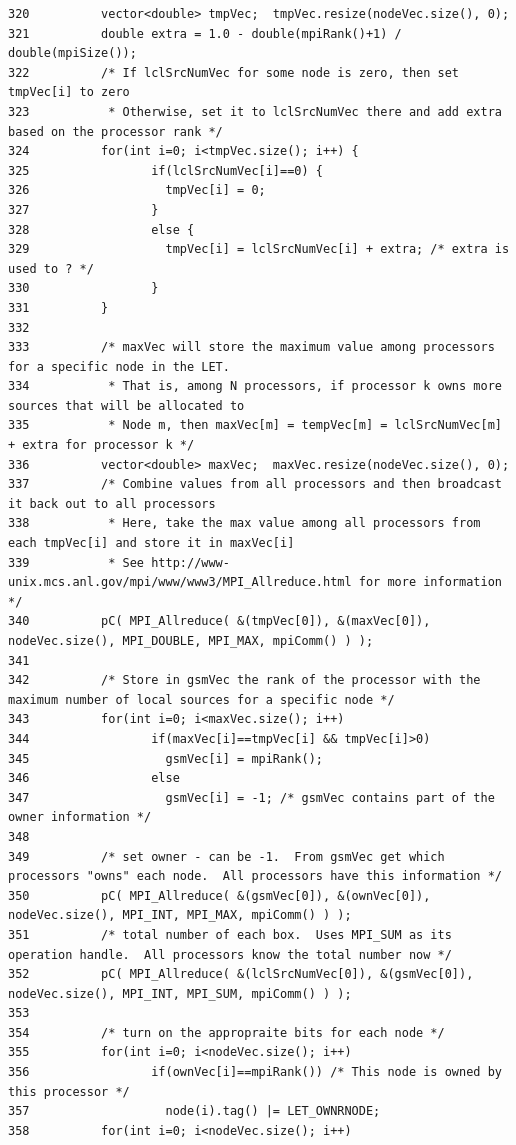 \begin{verbatim}
320          vector<double> tmpVec;  tmpVec.resize(nodeVec.size(), 0);
321          double extra = 1.0 - double(mpiRank()+1) / double(mpiSize());
322          /* If lclSrcNumVec for some node is zero, then set tmpVec[i] to zero
323           * Otherwise, set it to lclSrcNumVec there and add extra based on the processor rank */
324          for(int i=0; i<tmpVec.size(); i++) {
325                 if(lclSrcNumVec[i]==0) {
326                   tmpVec[i] = 0;
327                 }
328                 else {
329                   tmpVec[i] = lclSrcNumVec[i] + extra; /* extra is used to ? */
330                 }
331          }
332 
333          /* maxVec will store the maximum value among processors for a specific node in the LET.
334           * That is, among N processors, if processor k owns more sources that will be allocated to
335           * Node m, then maxVec[m] = tempVec[m] = lclSrcNumVec[m] + extra for processor k */
336          vector<double> maxVec;  maxVec.resize(nodeVec.size(), 0);
337          /* Combine values from all processors and then broadcast it back out to all processors
338           * Here, take the max value among all processors from each tmpVec[i] and store it in maxVec[i]
339           * See http://www-unix.mcs.anl.gov/mpi/www/www3/MPI_Allreduce.html for more information */
340          pC( MPI_Allreduce( &(tmpVec[0]), &(maxVec[0]), nodeVec.size(), MPI_DOUBLE, MPI_MAX, mpiComm() ) );
341 
342          /* Store in gsmVec the rank of the processor with the maximum number of local sources for a specific node */ 
343          for(int i=0; i<maxVec.size(); i++)
344                 if(maxVec[i]==tmpVec[i] && tmpVec[i]>0)
345                   gsmVec[i] = mpiRank();
346                 else
347                   gsmVec[i] = -1; /* gsmVec contains part of the owner information */
348 
349          /* set owner - can be -1.  From gsmVec get which processors "owns" each node.  All processors have this information */
350          pC( MPI_Allreduce( &(gsmVec[0]), &(ownVec[0]), nodeVec.size(), MPI_INT, MPI_MAX, mpiComm() ) );
351          /* total number of each box.  Uses MPI_SUM as its operation handle.  All processors know the total number now */
352          pC( MPI_Allreduce( &(lclSrcNumVec[0]), &(gsmVec[0]), nodeVec.size(), MPI_INT, MPI_SUM, mpiComm() ) );
353 
354          /* turn on the appropraite bits for each node */
355          for(int i=0; i<nodeVec.size(); i++)
356                 if(ownVec[i]==mpiRank()) /* This node is owned by this processor */
357                   node(i).tag() |= LET_OWNRNODE;
358          for(int i=0; i<nodeVec.size(); i++)

\end{verbatim}
